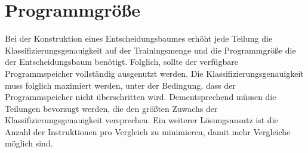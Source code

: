\section{Programmgröße}
\label{sec:eval_size}
Bei der Konstruktion eines Entscheidungsbaumes erhöht jede Teilung die Klassifizierungsgenauigkeit auf der Trainingsmenge und die Programmgröße die der Entscheidungsbaum benötigt. Folglich, sollte der verfügbare
Programmspeicher vollständig ausgenutzt werden. Die Klassifizierungsgenauigkeit muss folglich maximiert werden, unter der Bedingung, dass der Programmspeicher nicht überschritten wird. Dementsprechend müssen die Teilungen
bevorzugt werden, die den größten Zuwachs der Klassifizierungsgenauigkeit versprechen. Ein weiterer Lösungsansatz ist die Anzahl der Instruktionen pro Vergleich zu minimieren, damit mehr Vergleiche möglich sind.




